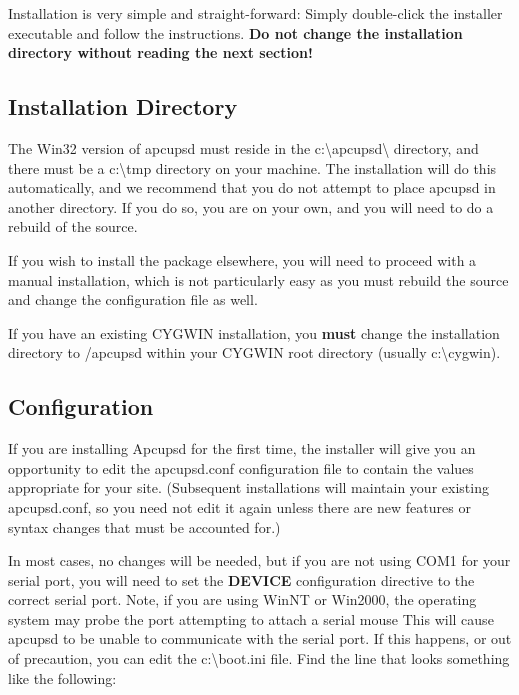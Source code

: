 {{{{{{{Installation is very simple and straight-forward: Simply double-click the
installer executable and follow the instructions. {\bf Do not change the
installation directory without reading the next section!}

\label{Installation-Directory}
\subsection*{Installation Directory}

\label{index-Windows_002c-Installation-Directory-172}
The Win32 version of apcupsd must reside in the
c:\textbackslash{}apcupsd\textbackslash{} directory, and there must be a
c:\textbackslash{}tmp directory on your machine. The installation will do this
automatically, and we recommend that you do not attempt to place apcupsd in
another directory. If you do so, you are on your own, and you will need to do
a rebuild of the source. 

If you wish to install the package elsewhere, you will need to proceed with a
manual installation, which is not particularly easy as you must rebuild the
source and change the configuration file as well.  

If you have an existing CYGWIN installation, you {\bf must} change the
installation directory to /apcupsd within your CYGWIN root directory
(usually c:\textbackslash{}cygwin).

\label{Configuration}
\subsection*{Configuration}

If you are installing Apcupsd for the first time, the installer will give
you an opportunity to edit the apcupsd.conf configuration file to contain
the values appropriate for your site. (Subsequent installations will
maintain your existing apcupsd.conf, so you need not edit it again unless
there are new features or syntax changes that must be accounted for.)

In most cases, no changes will be needed, but if you are not using COM1 
for your serial port, you will need to set the {\bf DEVICE} configuration
directive to the correct serial port. Note, if you are using WinNT or Win2000,
the operating system may probe the port attempting to attach a serial mouse
This will cause apcupsd to be unable to communicate with the serial port. 
If this happens, or out of precaution, you can edit the c:\textbackslash{}boot.ini
file. Find the line that looks something like the following:  

}}}}}}}
